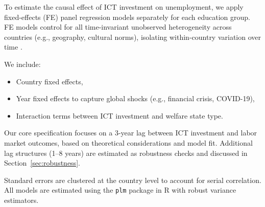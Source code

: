 To estimate the causal effect of ICT investment on unemployment, we apply fixed-effects (FE) panel 
regression models separately for each education group. FE models control for all time-invariant 
unobserved heterogeneity across countries (e.g., geography, cultural norms), isolating within-country 
variation over time \parencite{wooldridge2010econometric}.

We include:
\begin{itemize}
  \item Country fixed effects,
  \item Year fixed effects to capture global shocks (e.g., financial crisis, COVID-19),
  \item Interaction terms between ICT investment and welfare state type.
\end{itemize}

Our core specification focuses on a 3-year lag between ICT investment and labor market outcomes, 
based on theoretical considerations and model fit. Additional lag structures (1–8 years) are 
estimated as robustness checks and discussed in Section~\ref{sec:robustness}.

Standard errors are clustered at the country level to account for serial correlation. All models are 
estimated using the \texttt{plm} package in R with robust variance estimators.

